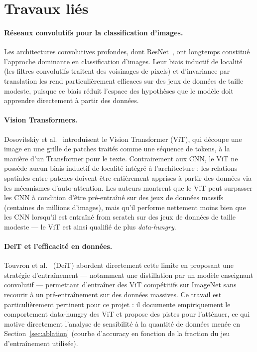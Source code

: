 \section{Travaux liés}
\label{sec:related_work}

\paragraph{Réseaux convolutifs pour la classification d'images.}
Les architectures convolutives profondes, dont ResNet~\cite{he2016resnet},
ont longtemps constitué l'approche dominante en classification d'images.
Leur biais inductif de localité (les filtres convolutifs traitent des
voisinages de pixels) et d'invariance par translation les rend
particulièrement efficaces sur des jeux de données de taille modeste,
puisque ce biais réduit l'espace des hypothèses que le modèle doit
apprendre directement à partir des données.

\paragraph{Vision Transformers.}
Dosovitskiy et al.~\cite{dosovitskiy2020vit} introduisent le Vision
Transformer (ViT), qui découpe une image en une grille de patches traités
comme une séquence de tokens, à la manière d'un Transformer pour le texte.
Contrairement aux CNN, le ViT ne possède aucun biais inductif de localité
intégré à l'architecture : les relations spatiales entre patches doivent
être entièrement apprises à partir des données via les mécanismes
d'auto-attention. Les auteurs montrent que le ViT peut surpasser les CNN
à condition d'être pré-entraîné sur des jeux de données massifs
(centaines de millions d'images), mais qu'il performe nettement moins
bien que les CNN lorsqu'il est entraîné from scratch sur des jeux de
données de taille modeste — le ViT est ainsi qualifié de plus
\emph{data-hungry}.

\paragraph{DeiT et l'efficacité en données.}
Touvron et al.~\cite{touvron2021deit} (DeiT) abordent directement cette
limite en proposant une stratégie d'entraînement — notamment une
distillation par un modèle enseignant convolutif — permettant d'entraîner
des ViT compétitifs sur ImageNet sans recourir à un pré-entraînement sur
des données massives. Ce travail est particulièrement pertinent pour ce
projet : il documente empiriquement le comportement data-hungry des ViT
et propose des pistes pour l'atténuer, ce qui motive directement l'analyse
de sensibilité à la quantité de données menée en
Section~\ref{sec:ablation} (courbe d'accuracy en fonction de la fraction
du jeu d'entraînement utilisée).

